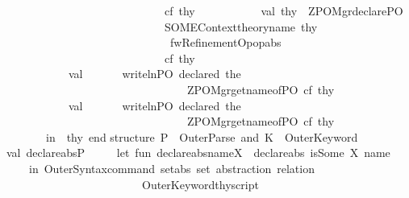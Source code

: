 \begin{isabellebody}
\ \ \ \ \ \ \ \ \ \ \ \ \ \ \ \ \ \ \ \ \ \ \ \ \ \ \ \ cf{}\ thy\isanewline
\ \ \ \ \ \ \ \ \ \ \ val\ thy{\isacharprime}{\isacharprime}\ {\isacharequal}\ ZPO{\isacharunderscore}Mgr{\isachardot}declare{\isacharunderscore}PO\ \isanewline
\ \ \ \ \ \ \ \ \ \ \ \ \ \ \ \ \ \ \ \ \ \ \ \ \ \ \ \ {\isacharparenleft}SOME{\isacharparenleft}Context{\isachardot}theory{\isacharunderscore}name\ thy{\isacharparenright}{\isacharcomma}\isanewline
\ \ \ \ \ \ \ \ \ \ \ \ \ \ \ \ \ \ \ \ \ \ \ \ \ \ \ \ \ {\isachardoublequote}fwRefinementOp{\isachardoublequote}{\isacharcomma}op{\isacharunderscore}abs{\isacharparenright}\ \isanewline
\ \ \ \ \ \ \ \ \ \ \ \ \ \ \ \ \ \ \ \ \ \ \ \ \ \ \ \ cf{}\ thy{\isacharprime}\isanewline
\ \ \ \ \ \ \ \ \ \ \ val\ {\isacharunderscore}\ \ \ \ \ {\isacharequal}\ writeln{\isacharparenleft}{\isachardoublequote}PO\ declared{\isacharcolon}\ {\isachardoublequote}{\isacharcircum}{\isacharparenleft}the\isanewline
\ \ \ \ \ \ \ \ \ \ \ \ \ \ \ \ \ \ \ \ \ \ \ \ \ \ \ \ \ \ \ \ {\isacharparenleft}ZPO{\isacharunderscore}Mgr{\isachardot}get{\isacharunderscore}name{\isacharunderscore}of{\isacharunderscore}PO\ cf{}\ thy{\isacharprime}{\isacharprime}{\isacharparenright}{\isacharparenright}{\isacharparenright}\ \isanewline
\ \ \ \ \ \ \ \ \ \ \ val\ {\isacharunderscore}\ \ \ \ \ {\isacharequal}\ writeln{\isacharparenleft}{\isachardoublequote}PO\ declared{\isacharcolon}\ {\isachardoublequote}{\isacharcircum}{\isacharparenleft}the\isanewline
\ \ \ \ \ \ \ \ \ \ \ \ \ \ \ \ \ \ \ \ \ \ \ \ \ \ \ \ \ \ \ \ {\isacharparenleft}ZPO{\isacharunderscore}Mgr{\isachardot}get{\isacharunderscore}name{\isacharunderscore}of{\isacharunderscore}PO\ cf{}\ thy{\isacharprime}{\isacharprime}{\isacharparenright}{\isacharparenright}{\isacharparenright}\ \isanewline
\ \ \ \ \ \ \ in\ \ thy{\isacharprime}{\isacharprime}\ end\isanewline
\isanewline
\isanewline
\isanewline
\isanewline
structure\ P\ {\isacharequal}\ OuterParse\ and\ K\ {\isacharequal}\ OuterKeyword{\isacharsemicolon}\isanewline
\isanewline
val\ declare{\isacharunderscore}absP\ {\isacharequal}\isanewline
\ \ \ \ let\ fun\ declare{\isacharunderscore}abs{\isacharprime}{\isacharparenleft}name{\isacharcomma}X{\isacharparenright}\ {\isacharequal}\ declare{\isacharunderscore}abs\ {\isacharparenleft}isSome\ X{\isacharparenright}\ name\ \isanewline
\ \ \ \ in\ OuterSyntax{\isachardot}command\ {\isachardoublequote}set{\isacharunderscore}abs{\isachardoublequote}\ {\isachardoublequote}set\ abstraction\ relation{\isachardoublequote}\ \isanewline
\ \ \ \ \ \ \ \ \ \ \ \ \ \ \ \ \ \ \ \ \ \ \ \ OuterKeyword{\isachardot}thy{\isacharunderscore}script\isanewline

\end{isabellebody}
